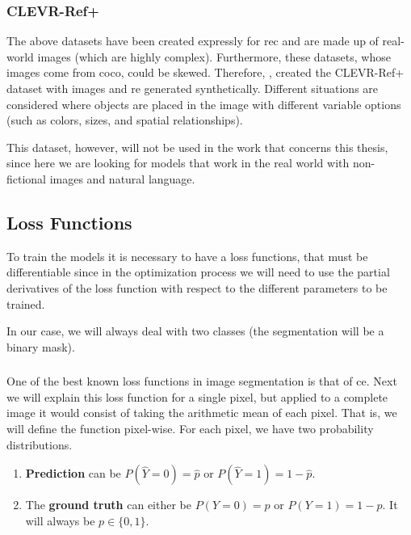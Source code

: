 \subsubsection{CLEVR-Ref+}

The above datasets have been created expressly for \gls{rec} and are made up of
real-world images (which are highly complex). Furthermore, these datasets,
whose images come from \gls{coco}, could be skewed. Therefore,
, created the CLEVR-Ref+ dataset with images and \gls{re}
generated synthetically. Different situations are considered where objects are
placed in the image with different variable options (such as colors, sizes, and
spatial relationships).

This dataset, however, will not be used in the work that concerns this thesis,
since here we are looking for models that work in the real world with
non-fictional images and natural language.


\subsection{Loss Functions}\label{sec:loss-functions}

To train the models it is necessary to have a loss functions, that must be
differentiable since in the optimization process we will need to use the
partial derivatives of the loss function with respect to the different
parameters to be trained.

In our case, we will always deal with two classes (the segmentation will be a
binary mask).

\subsubsection{}

One of the best known loss functions in image segmentation is that of
\gls{ce}. Next we will explain this loss function for a single pixel, but
applied to a complete image it would consist of taking the arithmetic mean of
each pixel. That is, we will define the function pixel-wise. For each pixel, we
have two probability distributions.

\begin{enumerate}
  \item \textbf{Prediction} can be \(P(\hat{Y} = 0) = \hat{p}\) or
  \(P(\hat{Y} = 1) = 1 - \hat{p}\).
  \item The \textbf{ground truth} can either be \(P(Y = 0) = p\) or
  \(P(Y = 1) = 1 - p\). It will always be \(p \in \{0, 1\}\).
\end{enumerate}

